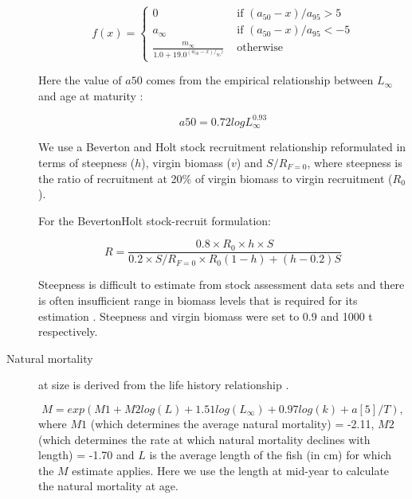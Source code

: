 \documentclass{pnastwo}
\begin{document}
\begin{article}
\begin{description}
\begin{equation}
f(x) = \left\{ \begin{array}{ll}
			0                                 &\mbox{ if $(a_{50}-x)/a_{95} >  5$} \\
			a_{\infty}                        &\mbox{ if $(a_{50}-x)/a_{95} < -5$} \\
			\frac{m_{\infty}}{1.0+19.0^{(a_{50}-x)/_{95})}} &\mbox{ otherwise}
		\end{array}
       \right.
\end{equation}

Here the value of $a50$ comes from the empirical relationship between $L_{\infty}$ and age at maturity \cite{gislason2008coexistence}:

\begin{equation}
  a50=0.72 logL_{\infty}^{0.93}
\end{equation}

We use a Beverton and Holt stock recruitment relationship reformulated in terms of steepness ($h$), virgin biomass ($v$) and $S/R_{F=0}$, 
where steepness is the ratio of recruitment at 20\% of virgin biomass to virgin recruitment ($R_0$). 

For the BevertonHolt stock-recruit formulation:

\begin{equation}
R=\frac{0.8 \times R_0 \times h \times S}{0.2 \times S/R_{F=0} \times R_0(1-h)+(h-0.2)S}
\end{equation} 

Steepness is difficult to estimate from stock assessment data sets and there is often insufficient range in biomass levels that is required for its estimation \cite{ISSF2011steep}.
Steepness and virgin biomass were set to 0.9 and 1000 t respectively.

\item[Natural mortality]
at size is derived from the life history relationship \cite{gislason2010does}.
               
\begin{equation}
            M = exp(M1 + M2 log(L) + 1.51log(L_{\infty}) + 0.97log(k) + a[5]/T),
\end{equation} 
where $M1$ (which determines the average natural mortality) = -2.11, $M2$ (which determines the rate at which natural mortality declines with length) = -1.70 and $L$ is 
the average length of the fish (in cm) for which the $M$ estimate applies. Here we use the length at mid-year to calculate the natural mortality at age.



\end{description}
\end{article}
\end{document}
